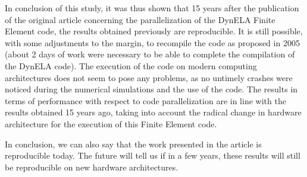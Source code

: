 In conclusion of this study, it was thus shown that 15 years after the publication of the original article \cite{Pantale:2005} concerning the parallelization of the DynELA Finite Element code, the results obtained previously are reproducible. It is still possible, with some adjustments to the margin, to recompile the code as proposed in 2005 (about 2 days of work were necessary to be able to complete the compilation of the DynELA code). The execution of the code on modern computing architectures does not seem to pose any problems, as no untimely crashes were noticed during the numerical simulations and the use of the code. The results in terms of performance with respect to code parallelization are in line with the results obtained 15 years ago, taking into account the radical change in hardware architecture for the execution of this Finite Element code.

In conclusion, we can also say that the work presented in the article \cite{Pantale:2005} is reproducible today. The future will tell us if in a few years, these results will still be reproducible on new hardware architectures.

